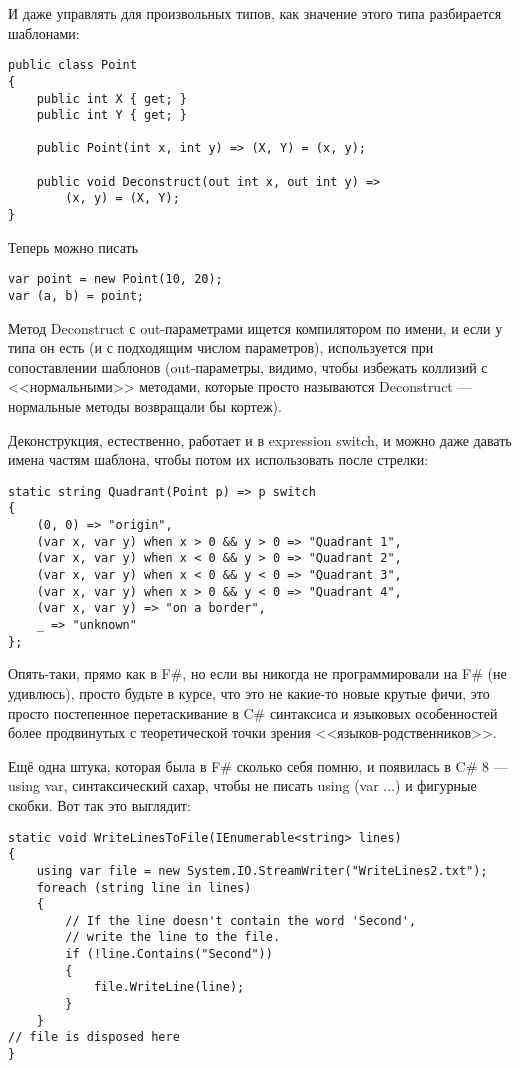 \documentclass{../../text-style}
\begin{document}
И даже управлять для произвольных типов, как значение этого типа разбирается шаблонами:

\begin{verbatim}
public class Point
{
    public int X { get; }
    public int Y { get; }

    public Point(int x, int y) => (X, Y) = (x, y);

    public void Deconstruct(out int x, out int y) =>
        (x, y) = (X, Y);
}
\end{verbatim}

Теперь можно писать

\begin{verbatim}
var point = new Point(10, 20);
var (a, b) = point;
\end{verbatim}

Метод Deconstruct с out-параметрами ищется компилятором по имени, и если у типа он есть (и с подходящим числом параметров), используется при сопоставлении шаблонов (out-параметры, видимо, чтобы избежать коллизий с <<нормальными>> методами, которые просто называются Deconstruct --- нормальные методы возвращали бы кортеж).

Деконструкция, естественно, работает и в expression switch, и можно даже давать имена частям шаблона, чтобы потом их использовать после стрелки:

\begin{verbatim}
static string Quadrant(Point p) => p switch
{
    (0, 0) => "origin",
    (var x, var y) when x > 0 && y > 0 => "Quadrant 1",
    (var x, var y) when x < 0 && y > 0 => "Quadrant 2",
    (var x, var y) when x < 0 && y < 0 => "Quadrant 3",
    (var x, var y) when x > 0 && y < 0 => "Quadrant 4",
    (var x, var y) => "on a border",
    _ => "unknown"
};
\end{verbatim}

Опять-таки, прямо как в F\#, но если вы никогда не программировали на F\# (не удивлюсь), просто будьте в курсе, что это не какие-то новые крутые фичи, это просто постепенное перетаскивание в C\# синтаксиса и языковых особенностей более продвинутых с теоретической точки зрения <<языков-родственников>>.

Ещё одна штука, которая была в F\# сколько себя помню, и появилась в C\# 8 --- using var, синтаксический сахар, чтобы не писать using (var ...) и фигурные скобки. Вот так это выглядит:

\begin{verbatim}
static void WriteLinesToFile(IEnumerable<string> lines)
{
    using var file = new System.IO.StreamWriter("WriteLines2.txt");
    foreach (string line in lines)
    {
        // If the line doesn't contain the word 'Second', 
        // write the line to the file.
        if (!line.Contains("Second"))
        {
            file.WriteLine(line);
        }
    }
// file is disposed here
}
\end{verbatim}
\end{document}
